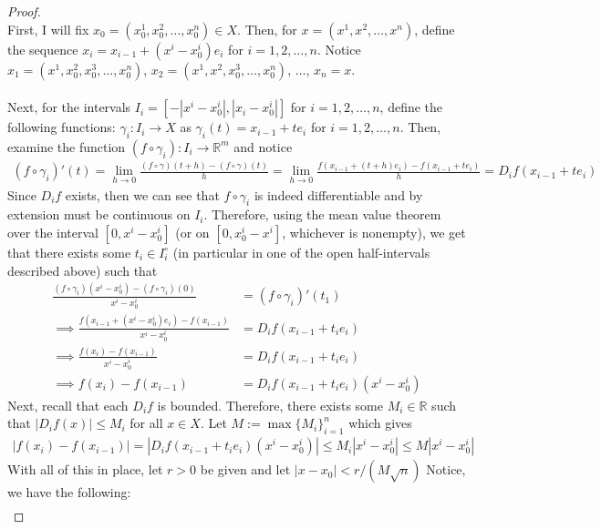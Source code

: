 \documentclass[10pt,a4paper]{article}
\theoremstyle{definition}
\theoremstyle{definition}
\numberwithin{equation}{section}
\begin{document}
\begin{proof}$ $
\\First, I will fix $x_0 = (x_0^1, x_0^2, \ldots, x_0^n) \in X$. Then, for $x = (x^1, x^2, \ldots, x^n)$, define the sequence $x_i = x_{i - 1} + (x^i - x_0^i)e_i$ for $i = 1, 2, \ldots, n$. Notice $x_1 = (x^1, x_0^2, x_0^3,  \ldots, x_0^n)$, $x_2 = (x^1, x^2, x_0^3, \ldots, x_0^n)$, $ \ldots$, $ x_n = x$. 
\\
\\Next, for the intervals $I_i = [-|x^i - x_0^i|, |x_i - x_0^i|]$ for $i = 1, 2, \ldots, n$, define the following functions: $\gamma_i: I_i \to X$ as $\gamma_i(t) = x_{i - 1} + te_i$ for $i = 1, 2, \ldots, n$. Then, examine the function $(f \circ \gamma_i): I_i \to \mathbb{R}^m$ and notice
\begin{align*}
(f \circ \gamma_i)'(t) = \lim_{h \to 0} \frac{(f \circ \gamma)(t + h) - (f \circ \gamma)(t)}{h} = \lim_{h \to 0} \frac{f(x_{i - 1} + (t + h)e_i) - f(x_{i - 1} + te_i)}{h} = D_i f(x_{i - 1} + te_i)
\end{align*}
Since $D_i f$ exists, then we can see that $f \circ \gamma_i$ is indeed differentiable and by extension must be continuous on $I_i$. Therefore, using the mean value theorem over the interval $[0, x^i - x_0^i]$ (or on $[0, x_0^i - x^i]$, whichever is nonempty), we get that there exists some $t_i \in I_i^\circ$ (in particular in one of the open half-intervals described above) such that
\begin{align*}
\frac{(f \circ \gamma_i)(x^i - x_0^i) - (f \circ \gamma_i)(0)}{x^i - x_0^i} &= (f \circ \gamma_i)'(t_1)\\
\implies \frac{f(x_{i - 1} + (x^i - x_0^i)e_i) - f(x_{i - 1})}{x^i - x_0^i} &= D_i f(x_{i - 1} + t_i e_i)\\
\implies \frac{f(x_i) - f(x_{i - 1})}{x^i - x_0^i} &= D_i f(x_{i - 1} + t_i e_i)\\
\implies f(x_i) - f(x_{i - 1}) &= D_i f(x_{i - 1} + t_i e_i ) (x^i - x_0^i)
\end{align*}
Next, recall that each $D_i f$ is bounded. Therefore, there exists some $M_i \in \mathbb{R}$ such that $|D_i f(x)| \leq M_i$ for all $x \in X$. Let $M := \max \{M_i\}_{i = 1}^n$ which gives
\begin{align*}
|f(x_i) - f(x_{i - 1})| = |D_i f(x_{i - 1} + t_i e_i ) (x^i - x_0^i)| \leq M_i|x^i - x_0^i| \leq M|x^i - x_0^i|
\end{align*}
With all of this in place, let $r > 0$ be given and let $|x - x_0| < r/(M \sqrt{n})$ Notice, we have the following:
\begin{align*}

\end{align*}
\end{proof}
\end{document}
